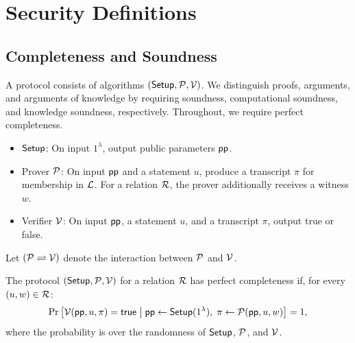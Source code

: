 \section{Security Definitions}
\label{appx:def}

\subsection{Completeness and Soundness}
\label{appx:soundness}
\begin{definition}
\label{def:proofArgumentAoK}
A protocol consists of algorithms $({\sf Setup},\mathcal{P},\mathcal{V})$.
We distinguish proofs, arguments, and arguments of knowledge by
requiring soundness, computational soundness, and knowledge
soundness, respectively. Throughout, we require perfect completeness.
\begin{itemize}
	\item ${\sf Setup}$:
	On input $1^\lambda$, output public parameters ${\sf pp}$.
	\item Prover $\mathcal{P}$:
	On input ${\sf pp}$ and a statement $u$, produce a transcript $\pi$
    for membership in $\mathcal{L}$. For a relation $\mathcal{R}$,
    the prover additionally receives a witness $w$.
	\item Verifier $\mathcal{V}$:
	On input ${\sf pp}$, a statement $u$, and a transcript $\pi$,
    output {\sf true} or {\sf false}.
\end{itemize}
Let ${(\mathcal{P} \rightleftharpoons \mathcal{V})}$ denote the interaction between $\mathcal{P}$ and $\mathcal{V}$.
\end{definition}

\begin{definition}
	\label{def:perfect-completeness}
The protocol $({\sf Setup},\mathcal{P},\mathcal{V})$ for a relation \(\mathcal{R}\)
has perfect completeness if, for every \((u,w)\in\mathcal{R}\):
\[
    \Pr\left[
        \mathcal{V}({\sf pp},u,\pi)={\sf true}
        \;\middle|\;
        {\sf pp}\leftarrow{\sf Setup}(1^\lambda),\;
        \pi\leftarrow\mathcal{P}({\sf pp},u,w)
    \right]
    =1,
\]
where the probability is over the randomness of
\({\sf Setup}\), \(\mathcal{P}\), and \(\mathcal{V}\).
\end{definition} 

